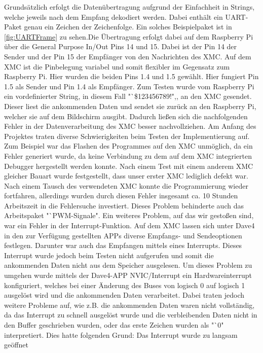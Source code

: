 \documentclass[12pt,a4paper,bibliography=totoc,listof=totoc]{scrartcl}
\begin{document}
Grundsätzlich erfolgt die Datenübertragung aufgrund der Einfachheit in Strings, welche jeweils nach dem 
Empfang dekodiert werden. Dabei enthält ein UART-Paket genau ein Zeichen der Zeichenfolge. Ein solches 
Beispielpaket ist in \ref{fig:UARTFrame} zu sehen.Die Übertragung erfolgt dabei auf dem Raspberry Pi über 
die General Purpose In/Out Pins 14 und 15. Dabei ist der Pin 14 der Sender und der Pin 15 der Empfänger 
von den Nachrichten des XMC. Auf dem XMC ist die Pinbelegung variabel und somit flexibler im Gegensatz 
zum Raspberry Pi. Hier wurden die beiden Pins 1.4 und 1.5 gewählt. Hier fungiert Pin 1.5 als Sender und 
Pin 1.4 als Empfänger. Zum Testen wurde vom Raspberry Pi ein vordefinierter String, in diesem Fall 
"`\$123456789!",, an den XMC gesendet. Dieser liest die ankommenden Daten und sendet sie zurück an den 
Raspberry Pi, welcher sie auf dem Bildschirm ausgibt. Dadurch ließen sich die nachfolgenden Fehler in 
der Datenverarbeitung des XMC besser nachvollziehen. Am Anfang des Projektes traten diverse Schwierigkeiten 
beim Testen der Implementierung auf. Zum Beispiel war das Flashen des Programmes auf den XMC unmöglich, 
da ein Fehler generiert wurde, da keine Verbindung zu dem auf dem XMC integrierten Debugger hergestellt 
werden konnte. Nach einem Test mit einem anderem XMC gleicher Bauart wurde festgestellt, dass unser erster 
XMC lediglich defekt war. Nach einem Tausch des verwendeten XMC konnte die Programmierung wieder 
fortfahren, allerdings wurden durch diesen Fehler insgesamt ca. 10 Stunden Arbeitszeit in die Fehlersuche 
investiert. Dieses Problem behinderte auch das Arbeitspaket "`PWM-Signale".
Ein weiteres Problem, auf das wir gestoßen sind, war ein Fehler in der Interrupt-Funktion. Auf dem XMC 
lassen sich unter Dave4 in den zur Verfügung gestellten APPs diverse Empfangs- und Sendeoptionen festlegen. 
Darunter war auch das Empfangen mittels eines Interrupts. Dieses Interrupt wurde jedoch beim Testen nicht 
aufgerufen und somit die ankommenden Daten nicht aus dem Speicher ausgelesen. Um dieses Problem zu umgehen 
wurde mittels der Dave4-APP NVIC/Interrupt ein Hardwareinterrupt konfiguriert, welches bei einer Änderung 
des Buses von logisch 0 auf logisch 1 ausgelöst wird und die ankommenden Daten verarbeitet. Dabei traten 
jedoch weitere Probleme auf, wie z.B. die ankommenden Daten waren nicht vollständig, da das Interrupt zu 
schnell ausgelöst wurde und die verbleibenden Daten nicht in den Buffer geschrieben wurden, oder das erste 
Zeichen wurden als "`0" \,interpretiert. Dies hatte folgenden Grund: Das Interrupt wurde zu langsam geöffnet 
\end{document}
